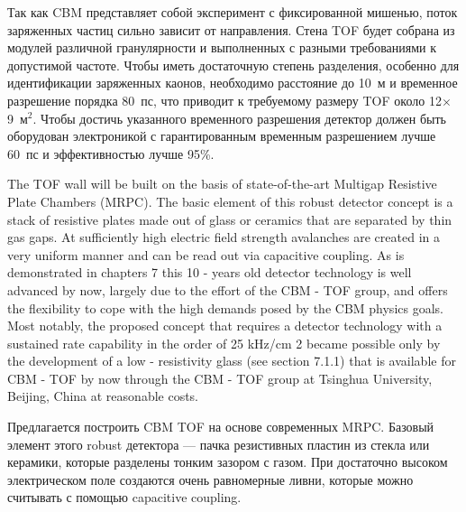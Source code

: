 Так как CBM представляет собой эксперимент с фиксированной мишенью, поток заряженных частиц сильно зависит от направления. Стена TOF будет собрана из модулей различной гранулярности и выполненных с разными требованиями к допустимой частоте. Чтобы иметь достаточную степень разделения, особенно для идентификации заряженных каонов, необходимо расстояние до 10~м и временное разрешение порядка 80~пс, что приводит к требуемому размеру TOF около 12$\times$9~м$^2$. Чтобы достичь указанного временного разрешения детектор должен быть оборудован электроникой с гарантированным временным разрешением лучше 60~пс и эффективностью лучше 95\%.


The TOF wall will be built on the basis of state-of-the-art Multigap Resistive Plate Chambers (MRPC). The basic element of this robust detector concept is a stack of resistive plates made out of glass or ceramics that are separated by thin gas gaps. At sufficiently high electric field strength avalanches are created in a very uniform manner and can be read out via capacitive coupling. As is demonstrated in chapters 7 this 10 - years old detector technology is well advanced by now, largely due to the effort of the CBM - TOF group, and offers the flexibility to cope with the high demands posed by the CBM physics goals. Most notably, the proposed concept that requires a detector technology with a sustained rate capability in the order of 25 kHz/cm 2 became possible only by the development of a low - resistivity glass (see section 7.1.1) that is available for CBM - TOF by now through the CBM - TOF group at Tsinghua University, Beijing, China at reasonable costs.

Предлагается построить CBM TOF на основе современных MRPC. Базовый элемент этого robust \todo детектора --- пачка резистивных пластин из стекла или керамики, которые разделены тонким зазором с газом. При достаточно высоком электрическом поле создаются очень равномерные ливни, которые можно считывать с помощью capacitive coupling.

